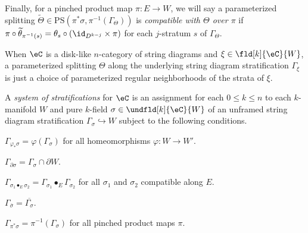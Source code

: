 \documentclass[12pt,reqno]{amsart}
\newcommand{\C}{\eC}
\newcommand{\blt}{\bullet}
\newcommand{\fcj}[1]{\overline{#1}}
\newcommand{\orev}{\overline}
\newcommand{\defn}[1]{\emph{#1}}
\begin{document}
Finally, for a pinched product map $\pi\colon E\to W$, we will say a parameterized splitting $\widetilde\Theta\in\mathrm{PS}(\pi^*\sigma,\pi^{-1}(\Gamma_\Theta))$ is \defn{compatible with $\Theta$ over $\pi$} if $\pi\circ\widetilde\theta_{\pi^{-1}(s)}=\theta_s\circ(\id_{D^{k-j}}\times\pi)$ for each $j$-stratum $s$ of $\Gamma_\Theta$.


\begin{example}
When $\C$ is a disk-like $n$-category of string diagrams and $\xi\in\fld[k]{\C}{W}$, a parameterized splitting $\Theta$ along the underlying string diagram stratification $\Gamma_\xi$ is just a choice of parameterized regular neighborhoods of the strata of $\xi$.
\end{example}

\begin{definition}
A \defn{system of stratifications} for $\C$ is an assignment for each $0\leq k\leq n$ to each $k$-manifold $W$ and pure $k$-field $\sigma\in\undfld[k]{\C}{W}$ of an unframed string diagram stratification $\Gamma_\sigma\hookrightarrow W$ subject to the following conditions.
\begin{lst}
  \item[($\Gamma\varphi$)]\label{axiom:Gamma-nat} $\Gamma_{\varphi_*\sigma}=\varphi(\Gamma_\sigma)$ for all homeomorphisms $\varphi\colon W\to W'$.
  \item[($\Gamma\partial$)]\label{axiom:Gamma-bdy} $\Gamma_{\partial\sigma}=\Gamma_\sigma\cap\partial W$.
  \item[($\Gamma$G)]\label{axiom:Gamma-gluing} $\Gamma_{\sigma_1\blt_E\sigma_2}=\Gamma_{\sigma_1}\blt_E\Gamma_{\sigma_2}$ for all $\sigma_1$ and $\sigma_2$ compatible along $E$.
  \item[($\Gamma\orev{\,\cdot\,}$)]\label{ur-axiom:Gamma-refl} $\Gamma_{\fcj\sigma}=\orev{\Gamma_\sigma}$.
  \item[($\Gamma\pi$)]\label{axiom:Gamma-products} $\Gamma_{\pi^*\sigma}=\pi^{-1}(\Gamma_\sigma)$ for all pinched product maps $\pi$.
\end{lst}
\end{definition}
\end{document}
